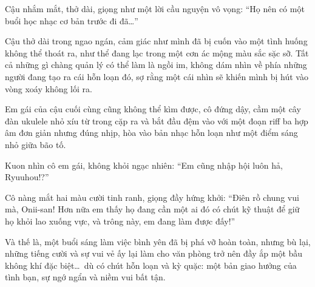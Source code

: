 \documentclass[../main.tex]{subfiles}
\begin{document}
Cậu nhắm mắt, thở dài, giọng như một lời cầu nguyện vô vọng: ``Họ nên có một buổi học nhạc cơ bản trước đi đã\dots''

Cậu thở dài trong ngao ngán, cảm giác như mình đã bị cuốn vào một tình huống không thể thoát ra, như thể đang lạc trong một cơn ác mộng màu sắc sặc sỡ. Tất cả những gì chàng quản lý có thể làm là ngồi im, không dám nhìn về phía những người đang tạo ra cái hỗn loạn đó, sợ rằng một cái nhìn sẽ khiến mình bị hút vào vòng xoáy không lối ra.

Em gái của cậu cuối cùng cũng không thể kìm được, cô đứng dậy, cầm một cây đàn ukulele nhỏ xíu từ trong cặp ra và bắt đầu đệm vào với một đoạn riff ba hợp âm đơn giản nhưng đúng nhịp, hòa vào bản nhạc hỗn loạn như một điểm sáng nhỏ giữa bão tố.

Kuon nhìn cô em gái, không khỏi ngạc nhiên: ``Em cũng nhập hội luôn hả, Ryuuhou!?''

Cô nàng mắt hai màu cười tinh ranh, giọng đầy hứng khởi: ``Điên rồ chung vui mà, Onii-san! Hơn nữa em thấy họ đang cần một ai đó có chút kỹ thuật để giữ họ khỏi lao xuống vực, và trông này, em đang làm được đấy!''

Và thế là, một buổi sáng làm việc bình yên đã bị phá vỡ hoàn toàn, nhưng bù lại, những tiếng cười và sự vui vẻ ấy lại làm cho văn phòng trở nên đầy ắp một bầu không khí đặc biệt\dots\ dù có chút hỗn loạn và kỳ quặc:  một bản giao hưởng của tình bạn, sự ngớ ngẩn và niềm vui bất tận.
\end{document}
